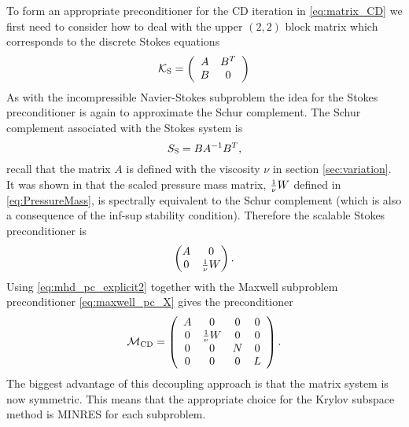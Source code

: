 To form an appropriate preconditioner for the CD iteration in \eqref{eq:matrix_CD} we first need to consider how to deal with the upper $(2,2)$ block matrix which corresponds to the discrete Stokes equations
\begin{equation}\nonumber
   \mathcal{K}_{\rm S} =
    \left(
    \begin{array}{cc}
    A& B^T \\
    B & 0
    \end{array}
    \right)
\end{equation}
As with the incompressible Navier-Stokes subproblem the idea for the Stokes preconditioner is again to approximate the Schur complement. The Schur complement associated with the Stokes system is
$$S_{\rm S} =  BA^{-1}B^T,$$
recall that the matrix $A$ is defined with the viscosity $\nu$ in section \ref{sec:variation}. It was shown in \cite{silvester1993fast,silvester1994fast} that the scaled pressure mass matrix, $\mbox{\small \(\frac{1}{\nu}\)} W$ defined in \eqref{eq:PressureMass}, is spectrally equivalent to the Schur complement (which is also a consequence of the inf-sup stability condition). Therefore the scalable Stokes preconditioner is
\begin{equation*}
\label{eq:mhd_pc_explicit2_1}
\begin{pmatrix}
A & 0 \\
0 & \mbox{\small \(\frac{1}{\nu}\)} W
\end{pmatrix}.
\end{equation*}
Using \eqref{eq:mhd_pc_explicit2} together with the Maxwell subproblem preconditioner  \eqref{eq:maxwell_pc_X} gives the preconditioner
\begin{equation}
\label{eq:mhd_pc_explicit2}
\mathcal{M}_{\rm CD} =
\left(
\begin{array}{cccc}
A & 0 & 0 & 0\\
0 & \mbox{\small \(\frac{1}{\nu}\)} W & 0 & 0 \\
0 & 0 & N & 0\\
0 & 0 & 0 & L
\end{array}
\right).
\end{equation}
The biggest advantage of this decoupling approach is that the matrix system is now symmetric. This means that the appropriate choice for the Krylov subspace method is MINRES for each subproblem.
